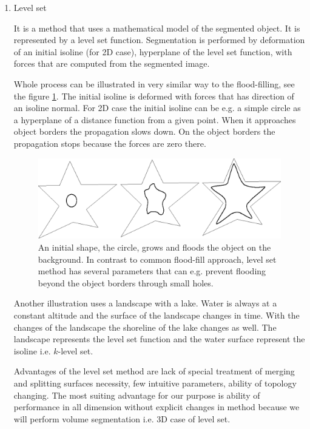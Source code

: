 \begin{enumerate}
  \item Level set

\par
It is a method that uses a mathematical model of the segmented object.
It is represented by a level set function.
Segmentation is performed by deformation of an initial isoline (for 2D case), hyperplane of the level set function, with forces that are computed from the segmented image.

\par
Whole process can be illustrated in very similar way to the flood-filling, see the figure \ref{fg:flooding}.
The initial isoline is deformed with forces that has direction of an isoline normal.
For 2D case the initial isoline can be e.g. a simple circle as a hyperplane of a distance function from a given point.
When it approaches object borders the propagation slows down.
On the object borders the propagation stops because the forces are zero there.

\begin{figure}
    \centering
    \includegraphics[width=12cm]{data/flooding}
    \caption[Flooding an object]{An initial shape, the circle, grows and floods the object on the background.
In contrast to common flood-fill approach, level set method has several parameters that can e.g. prevent flooding beyond the object borders through small holes.}
    \label{fg:flooding}
\end{figure}

\par
Another illustration uses a landscape with a lake.
Water is always at a constant altitude and the surface of the landscape changes in time.
With the changes of the landscape the shoreline of the lake changes as well.
The landscape represents the level set function and the water surface represent the isoline i.e. $k$-level set.

\par
Advantages of the level set method are lack of special treatment of merging and splitting surfaces necessity, few intuitive parameters, ability of topology changing.
The most suiting advantage for our purpose is ability of performance in all dimension without explicit changes in method because we will perform volume segmentation i.e. 3D case of level set.

\end{enumerate}

